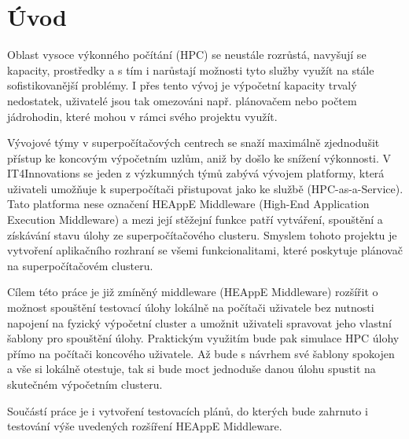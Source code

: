 \chapter{Úvod}
\label{sec:Introduction}
Oblast vysoce výkonného počítání (HPC) se neustále rozrůstá, navyšují se kapacity, prostředky a s tím i narůstají možnosti tyto služby využít na stále sofistikovanější problémy. I přes tento vývoj je výpočetní kapacity trvalý nedostatek, uživatelé jsou tak omezováni např. plánovačem nebo počtem jádrohodin, které mohou v rámci svého projektu využít.

Vývojové týmy v superpočítačových centrech se snaží maximálně zjednodušit přístup ke koncovým výpočetním uzlům, aniž by došlo ke snížení výkonnosti. V IT4Innovations se jeden z výzkumných týmů zabývá vývojem platformy, která uživateli umožňuje k superpočítači přistupovat jako ke službě (HPC-as-a-Service). Tato platforma nese označení HEAppE Middleware (High-End Application Execution Middleware) a mezi její stěžejní funkce patří vytváření, spouštění a získávání stavu úlohy ze superpočítačového clusteru. Smyslem tohoto projektu je vytvoření aplikačního rozhraní se všemi funkcionalitami, které poskytuje plánovač na superpočítačovém clusteru. 

Cílem této práce je již zmíněný middleware (HEAppE Middleware) rozšířit o možnost spouštění testovací úlohy lokálně na počítači uživatele bez nutnosti napojení na fyzický výpočetní cluster a umožnit uživateli spravovat jeho vlastní šablony pro spouštění úlohy. Praktickým využitím bude pak simulace HPC úlohy přímo na počítači koncového uživatele. Až bude s návrhem své šablony spokojen a vše si lokálně otestuje, tak si bude moct jednoduše danou úlohu spustit na skutečném výpočetním clusteru.

Součástí práce je i vytvoření testovacích plánů, do kterých bude zahrnuto i testování výše uvedených rozšíření HEAppE Middleware.
\endinput